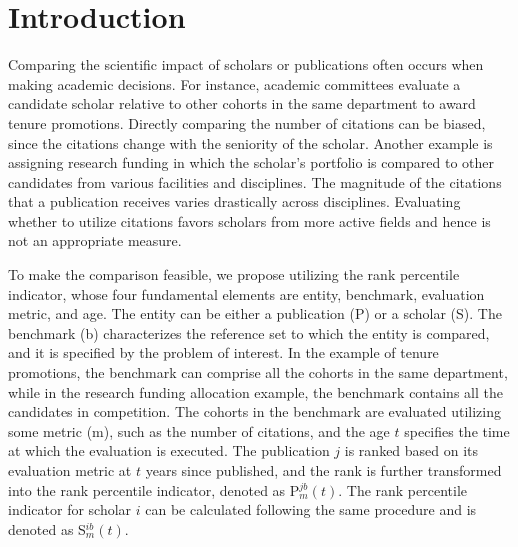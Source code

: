 \section*{Introduction}

Comparing the scientific impact of scholars or publications often occurs when making academic decisions. For instance, academic committees evaluate a candidate scholar relative to other cohorts in the same department to award tenure promotions. Directly comparing the number of citations can be biased, since the citations change with the seniority of the scholar. Another example is assigning research funding in which the scholar’s portfolio is compared to other candidates from various facilities and disciplines. The magnitude of the citations that a publication receives varies drastically across disciplines. Evaluating whether to utilize citations favors scholars from more active fields and hence is not an appropriate measure.

To make the comparison feasible, we propose utilizing the rank percentile indicator, whose four fundamental elements are entity, benchmark, evaluation metric, and age. The entity can be either a publication (P) or a scholar (S). The benchmark (b) characterizes the reference set to which the entity is compared, and it is specified by the problem of interest. In the example of tenure promotions, the benchmark can comprise all the cohorts in the same department, while in the research funding allocation example, the benchmark contains all the candidates in competition. The cohorts in the benchmark are evaluated utilizing some metric (m), such as the number of citations, and the age $t$ specifies the time at which the evaluation is executed. The publication $j$ is ranked based on its evaluation metric at $t$ years since published, and the rank is further transformed into the rank percentile indicator, denoted as P$_{m}^{jb}(t)$. The rank percentile indicator for scholar $i$ can be calculated following the same procedure and is denoted as S$_{m}^{ib}(t)$.


